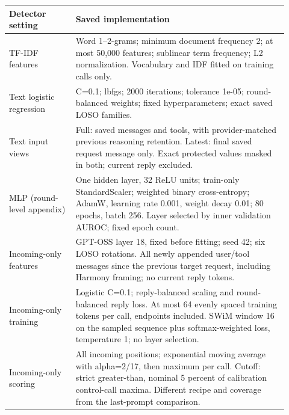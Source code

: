 \begin{tabular}{p{0.22\linewidth}p{0.70\linewidth}}
\toprule
Detector setting & Saved implementation \\
\midrule
TF-IDF features & Word 1--2-grams; minimum document frequency 2; at most 50,000 features; sublinear term frequency; L2 normalization. Vocabulary and IDF fitted on training calls only. \\
Text logistic regression & C=0.1; lbfgs; 2000 iterations; tolerance 1e-05; round-balanced weights; fixed hyperparameters; exact saved LOSO families. \\
Text input views & Full: saved messages and tools, with provider-matched previous reasoning retention. Latest: final saved request message only. Exact protected values masked in both; current reply excluded. \\
MLP (round-level appendix) & One hidden layer, 32 ReLU units; train-only StandardScaler; weighted binary cross-entropy; AdamW, learning rate 0.001, weight decay 0.01; 80 epochs, batch 256. Layer selected by inner validation AUROC; fixed epoch count. \\
Incoming-only features & GPT-OSS layer 18, fixed before fitting; seed 42; six LOSO rotations. All newly appended user/tool messages since the previous target request, including Harmony framing; no current reply tokens. \\
Incoming-only training & Logistic C=0.1; reply-balanced scaling and round-balanced reply loss. At most 64 evenly spaced training tokens per call, endpoints included. SWiM window 16 on the sampled sequence plus softmax-weighted loss, temperature 1; no layer selection. \\
Incoming-only scoring & All incoming positions; exponential moving average with alpha=2/17, then maximum per call. Cutoff: strict greater-than, nominal 5 percent of calibration control-call maxima. Different recipe and coverage from the last-prompt comparison. \\
\bottomrule
\end{tabular}

